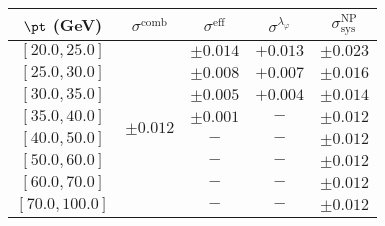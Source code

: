 \begin{tabular}{c||c|c|c||c}
$\pt$ (GeV) & $\sigma^{\text{comb}}$ & $\sigma^{\text{eff}}$ & $\sigma^{\lambda_\varphi}$ & $\sigma_{\text{sys}}^{\text{NP}}$ \\
\hline
$[20.0, 25.0]$ & \multirow{8}{*}{$\pm0.012$} & $\pm0.014$ & $+0.013$ & $\pm0.023$\\
$[25.0, 30.0]$ &  & $\pm0.008$ & $+0.007$ & $\pm0.016$\\
$[30.0, 35.0]$ &  & $\pm0.005$ & $+0.004$ & $\pm0.014$\\
$[35.0, 40.0]$ &  & $\pm0.001$ & $-$ & $\pm0.012$\\
$[40.0, 50.0]$ &  & $-$ & $-$ & $\pm0.012$\\
$[50.0, 60.0]$ &  & $-$ & $-$ & $\pm0.012$\\
$[60.0, 70.0]$ &  & $-$ & $-$ & $\pm0.012$\\
$[70.0, 100.0]$ &  & $-$ & $-$ & $\pm0.012$\\
\end{tabular}
